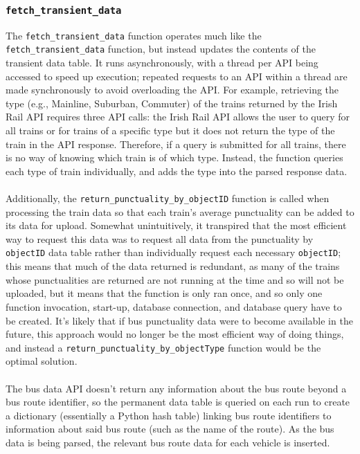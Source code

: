 \documentclass[a4paper,11pt]{report}
\begin{document}
\subsubsection{\texttt{fetch_transient_data}}
The \verb|fetch_transient_data| function operates much like the \verb|fetch_transient_data| function, but instead updates the contents of the transient data table.
It runs asynchronously, with a thread per API being accessed to speed up execution;
repeated requests to an API within a thread are made synchronously to avoid overloading the API.
For example, retrieving the type (e.g., Mainline, Suburban, Commuter) of the trains returned by the Irish Rail API requires three API calls:
the Irish Rail API allows the user to query for all trains or for trains of a specific type but it does not return the type of the train in the API response.
Therefore, if a query is submitted for all trains, there is no way of knowing which train is of which type.
Instead, the function queries each type of train individually, and adds the type into the parsed response data.
\\\\
Additionally, the \verb|return_punctuality_by_objectID| function is called when processing the train data so that each train's average punctuality can be added to its data for upload.
Somewhat unintuitively, it transpired that the most efficient way to request this data was to request all data from the punctuality by \verb|objectID| data table rather than individually request each necessary \verb|objectID|;
this means that much of the data returned is redundant, as many of the trains whose punctualities are returned are not running at the time and so will not be uploaded, but it means that the function is only ran once, and so only one function invocation, start-up, database connection, and database query have to be created.
It's likely that if bus punctuality data were to become available in the future, this approach would no longer be the most efficient way of doing things, and instead a \verb|return_punctuality_by_objectType| function would be the optimal solution.
\\\\
The bus data API doesn't return any information about the bus route beyond a bus route identifier, so the permanent data table is queried on each run to create a dictionary (essentially a Python hash table\supercite{pythondict}) linking bus route identifiers to information about said bus route (such as the name of the route).
As the bus data is being parsed, the relevant bus route data for each vehicle is inserted.
\end{document}
